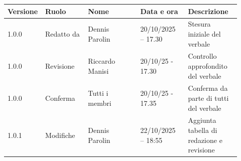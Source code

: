 \documentclass[a4paper,12pt]{article}
\begin{document}
\begin{center}
\small
\renewcommand{\arraystretch}{1.2} 
\begin{tabular}{|p{0.1\linewidth}|p{0.18\linewidth}|p{0.22\linewidth}|p{0.20\linewidth}|p{0.22\linewidth}|}
\hline
\rowcolor{gray!60} 
\textbf{Versione} & \textbf{Ruolo} & \textbf{Nome} & \textbf{Data e ora} & \textbf{Descrizione} \\
\hline
\rowcolor{white}
1.0.0 & Redatto da & Dennis Parolin & 20/10/2025 – 17.30 & Stesura iniziale del verbale \\
\hline
\rowcolor{gray!20}
1.0.0 & Revisione & Riccardo Manisi & 20/10/25 - 17.30 & Controllo approfondito del verbale \\
\hline
\rowcolor{white}
1.0.0 & Conferma & Tutti i membri & 20/10/25 - 17.35 & Conferma da parte di tutti del verbale \\
\hline
\rowcolor{gray!20}
1.0.1 & Modifiche & Dennis Parolin & 22/10/2025 – 18:55 & Aggiunta tabella di redazione e revisione \\
\hline
\end{tabular}
\end{center}
\end{document}
